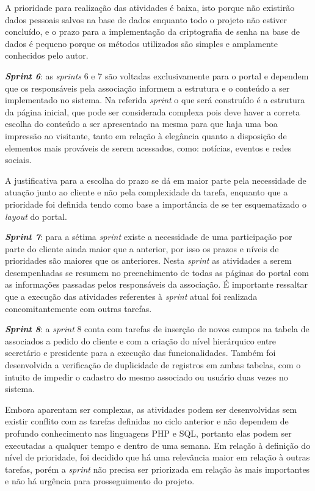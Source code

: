 A prioridade para realização das atividades é baixa, isto porque não existirão dados pessoais salvos na base de dados enquanto todo o projeto não estiver concluído, e o prazo para a implementação da criptografia de senha na base de dados é pequeno porque os métodos utilizados são simples e amplamente conhecidos pelo autor.

\textbf{\textit{Sprint 6}}: as \textit{sprints} 6 e 7 são voltadas exclusivamente para o portal e dependem que os responsáveis pela associação informem a estrutura e o conteúdo a ser implementado no sistema. Na referida \textit{sprint} o que será construído é a estrutura da página inicial, que pode ser considerada complexa pois deve haver a correta escolha do conteúdo a ser apresentado na mesma para que haja uma boa impressão ao visitante, tanto em relação à elegância quanto a disposição de elementos mais prováveis de serem acessados, como: notícias, eventos e redes sociais. 

A justificativa para a escolha do prazo se dá em maior parte pela necessidade de atuação junto ao cliente e não pela complexidade da tarefa, enquanto que a prioridade foi definida tendo como base a importância de se ter esquematizado o \textit{layout} do portal.

\textbf{\textit{Sprint 7}}: para a sétima \textit{sprint} existe a necessidade de uma participação por parte do cliente ainda maior que a anterior, por isso os prazos e níveis de prioridades são maiores que os anteriores. Nesta \textit{sprint} as atividades a serem desempenhadas se resumem no preenchimento de todas as páginas do portal com as informações passadas pelos responsáveis da associação. É importante ressaltar que a execução das atividades referentes à \textit{sprint} atual foi realizada concomitantemente com outras tarefas. 

\textbf{\textit{Sprint 8}}: a \textit{sprint} 8 conta com tarefas de inserção de novos campos na tabela de associados a pedido do cliente e com a criação do nível hierárquico entre secretário e presidente para a execução das funcionalidades. Também foi desenvolvida a verificação de duplicidade de registros em ambas tabelas, com o intuito de impedir o cadastro do mesmo associado ou usuário duas vezes no sistema. 

Embora aparentam ser complexas, as atividades podem ser desenvolvidas sem existir conflito com as tarefas definidas no ciclo anterior e não dependem de profundo conhecimento nas linguagens PHP e SQL, portanto elas podem ser executadas a qualquer tempo e dentro de uma semana. Em relação à definição do nível de prioridade, foi decidido que há uma relevância maior em relação à outras tarefas, porém a \textit{sprint} não precisa ser priorizada em relação às mais importantes e não há urgência para prosseguimento do projeto. 

